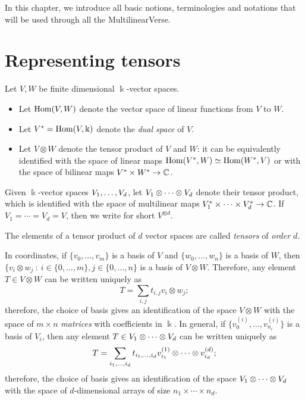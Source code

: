 In this chapter, we introduce all basic notions, terminologies and notations that will be used through all the MultilinearVerse. 

\section{Representing tensors}
\label{introduction-section-representingtensors}

\begin{definition}
\label{introduction-definition-tensor_product}
Let $V,W$ be finite dimensional $\Bbbk$-vector spaces.
\begin{itemize}
    \item Let $\operatorname{Hom}(V,W)$ denote the vector space of linear functions from $V$ to $W$.
    \item Let $V^* = \operatorname{Hom}(V,\Bbbk)$ denote the \emph{dual space} of $V$.
    \item Let $V \otimes W$ denote the tensor product of $V$ and $W$: it can be equivalently identified with the space of linear maps $\operatorname{Hom}(V^*,W) \simeq \operatorname{Hom}(W^*,V)$ or with the space of bilinear maps $V^* \times W^* \to \mathbb{C}$.
\end{itemize}
Given $\Bbbk$-vector spaces $V_1 , \ldots , V_d$, let $V_1 \otimes \cdots \otimes V_d$ denote their tensor product, which is identified with the space of multilinear maps $V_1^* \times \cdots \times V_d^* \to \mathbb{C}$. If $V_1 = \cdots = V_d = V$, then we write for short $V^{\otimes d}$. 

The elements of a tensor product of $d$ vector spaces are called \emph{tensors} of \emph{order $d$}.

In coordinates, if $\{v_0,\ldots,v_m\}$ is a basis of $V$ and $\{w_0,\ldots,w_n\}$ is a basis of $W$, then $\{v_i \otimes w_j ~:~ i \in \{0,\ldots,m\}, j \in \{0,\ldots,n\}$ is a basis of $V\otimes W$. Therefore, any element $T \in V\otimes W$ can be written uniquely as 
\[
    T = \sum_{i,j} t_{i,j}v_i\otimes w_j;
\]
therefore, the choice of basis gives an identification of the space $V\otimes W$ with the space of $m\times n$ \emph{matrices} with coefficients in $\Bbbk$. In general, if $\{v_0^{(i)},\ldots,v_{n_i}^{(i)}\}$ is a basis of $V_i$, then any element $T \in V_1 \otimes \cdots \otimes V_d$ can be written uniquely as 
\[
    T = \sum_{i_1,\ldots,i_d} t_{i_1,\ldots,i_d}v_{i_1}^{(1)}\otimes \cdots \otimes v_{i_d}^{(d)};
\]
therefore, the choice of basis gives an identification of the space $V_1 \otimes \cdots \otimes V_d$ with the space of $d$-dimensional arrays of size $n_1 \times\cdots\times n_d$. 
\end{definition}

